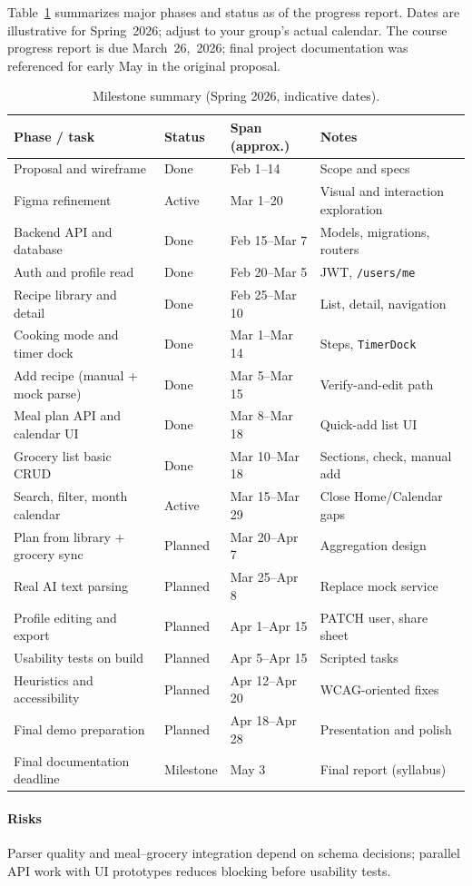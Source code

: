 Table~\ref{tab:gantt} summarizes major phases and status as of the progress report. Dates are illustrative for Spring~2026; adjust to your group's actual calendar. The course progress report is due March~26,~2026; final project documentation was referenced for early May in the original proposal.

\begin{table}[!t]
\centering
\caption{Milestone summary (Spring 2026, indicative dates).}
\label{tab:gantt}
\begin{tabular}{@{}p{}p{}p{}p{}@{}}
\toprule
\textbf{Phase / task} & \textbf{Status} & \textbf{Span (approx.)} & \textbf{Notes} \\
\midrule
Proposal and wireframe & Done & Feb 1--14 & Scope and specs \\
Figma refinement & Active & Mar 1--20 & Visual and interaction exploration \\
Backend API and database & Done & Feb 15--Mar 7 & Models, migrations, routers \\
Auth and profile read & Done & Feb 20--Mar 5 & JWT, \texttt{/users/me} \\
Recipe library and detail & Done & Feb 25--Mar 10 & List, detail, navigation \\
Cooking mode and timer dock & Done & Mar 1--Mar 14 & Steps, \texttt{TimerDock} \\
Add recipe (manual + mock parse) & Done & Mar 5--Mar 15 & Verify-and-edit path \\
Meal plan API and calendar UI & Done & Mar 8--Mar 18 & Quick-add list UI \\
Grocery list basic CRUD & Done & Mar 10--Mar 18 & Sections, check, manual add \\
\midrule
Search, filter, month calendar & Active & Mar 15--Mar 29 & Close Home/Calendar gaps \\
Plan from library + grocery sync & Planned & Mar 20--Apr 7 & Aggregation design \\
Real AI text parsing & Planned & Mar 25--Apr 8 & Replace mock service \\
Profile editing and export & Planned & Apr 1--Apr 15 & PATCH user, share sheet \\
\midrule
Usability tests on build & Planned & Apr 5--Apr 15 & Scripted tasks \\
Heuristics and accessibility & Planned & Apr 12--Apr 20 & WCAG-oriented fixes~\cite{wcag21} \\
Final demo preparation & Planned & Apr 18--Apr 28 & Presentation and polish \\
Final documentation deadline & Milestone & May 3 & Final report (syllabus) \\
\bottomrule
\end{tabular}
\end{table}

\paragraph{Risks}
Parser quality and meal--grocery integration depend on schema decisions; parallel API work with UI prototypes reduces blocking before usability tests.
